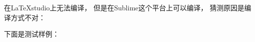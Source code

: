 \documentclass{article}
\begin{document}
在LaTeXstudio上无法编译，
但是在Sublime这个平台上可以编译，
猜测原因是编译方式不对：

下面是测试样例：

\XeLaTeX 
\end{document}
